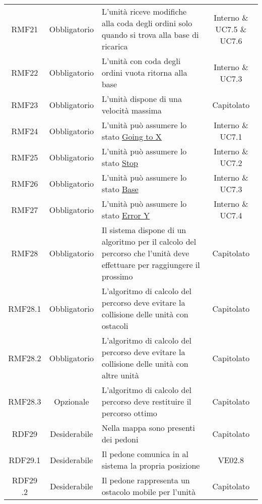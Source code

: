 \begin{longtable}[h!] { c c m{8cm} c}
		RMF21 & Obbligatorio & L'unità riceve modifiche alla coda degli ordini solo quando si trova alla base di ricarica & Interno \& UC7.5 \& UC7.6 \\

		RMF22 & Obbligatorio & L'unità con coda degli ordini vuota ritorna alla base & Interno \& UC7.3 \\

		RMF23 & Obbligatorio & L'unità dispone di una velocità massima & Capitolato \\

		RMF24 & Obbligatorio & L'unità può assumere lo stato \underline{Going to X} & Interno \& UC7.1 \\

		RMF25 & Obbligatorio & L'unità può assumere lo stato \underline{Stop} & Interno \& UC7.2 \\

		RMF26 & Obbligatorio & L'unità può assumere lo stato \underline{Base} & Interno \& UC7.3 \\

		RMF27 & Obbligatorio & L'unità può assumere lo stato \underline{Error Y} & Interno \& UC7.4 \\

		RMF28 & Obbligatorio & Il sistema dispone di un algoritmo per il calcolo del percorso che l'unità deve effettuare per raggiungere il prossimo \glock{POI} & Capitolato \\

		RMF28.1 & Obbligatorio & L'algoritmo di calcolo del percorso deve evitare la collisione delle unità con ostacoli & Capitolato \\

		RMF28.2 & Obbligatorio & L'algoritmo di calcolo del percorso deve evitare la collisione delle unità con altre unità & Capitolato \\

		RMF28.3 & Opzionale & L'algoritmo di calcolo del percorso deve restituire il percorso ottimo & Capitolato \\

		RDF29 & Desiderabile & Nella mappa sono presenti dei pedoni & Capitolato \\

		RDF29.1 & Desiderabile & Il pedone comunica in \glock{real-time} al sistema la propria posizione & VE02.8 \\

		RDF29 .2 & Desiderabile & Il pedone rappresenta un ostacolo mobile per l'unità & Capitolato \\

	\end{longtable}

